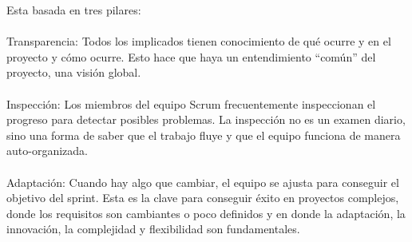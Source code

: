 Esta basada en tres pilares:
\\
\\
Transparencia: Todos los implicados tienen conocimiento de qué ocurre y en el proyecto y cómo ocurre. Esto hace que haya un entendimiento “común” del proyecto, una visión global.
\\
\\
Inspección: Los miembros del equipo Scrum frecuentemente inspeccionan el progreso para detectar posibles problemas. La inspección no es un examen diario, sino una forma de saber que el trabajo fluye y que el equipo funciona de manera auto-organizada.
\\
\\
Adaptación: Cuando hay algo que cambiar, el equipo se ajusta para conseguir el objetivo del sprint. Esta es la clave para conseguir éxito en proyectos complejos, donde los requisitos son cambiantes o poco definidos y en donde la adaptación, la innovación, la complejidad y flexibilidad son fundamentales.
